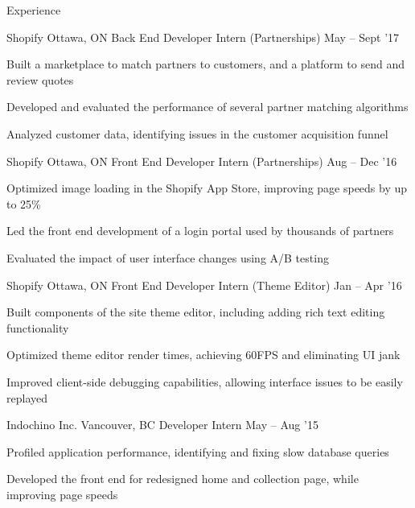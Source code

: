 \documentclass{resume} %
\begin{document}
\begin{rSection}{Experience}
  \begin{rSubsection}{Shopify}
                     {Ottawa, ON}
                     {Back End Developer Intern (Partnerships)}
                     {May -- Sept '17}
    \item Built a marketplace to match partners to customers, and a platform to send and review quotes
    \item Developed and evaluated the performance of several partner matching algorithms
    \item Analyzed customer data, identifying issues in the customer acquisition funnel
  \end{rSubsection}

  \begin{rSubsection}{Shopify}
                     {Ottawa, ON}
                     {Front End Developer Intern (Partnerships)}
                     {Aug -- Dec '16}

    \item Optimized image loading in the Shopify App Store, improving page speeds by up to 25\%
    \item Led the front end development of a login portal used by thousands of partners
    \item Evaluated the impact of user interface changes using A/B testing
  \end{rSubsection}

  \begin{rSubsection}{Shopify}
                     {Ottawa, ON}
                     {Front End Developer Intern (Theme Editor)}
                     {Jan -- Apr '16}
    \item Built components of the site theme editor, including adding rich text editing functionality
    \item Optimized theme editor render times, achieving 60FPS and eliminating UI jank
    \item Improved client-side debugging capabilities, allowing interface issues to be easily replayed
  \end{rSubsection}

  \begin{rSubsection}{Indochino Inc.}
                     {Vancouver, BC}
                     {Developer Intern}
                     {May -- Aug '15}
    \item Profiled application performance, identifying and fixing slow database queries
    \item Developed the front end for redesigned home and collection page, while improving page speeds
  \end{rSubsection}

\end{rSection}
\end{document}
